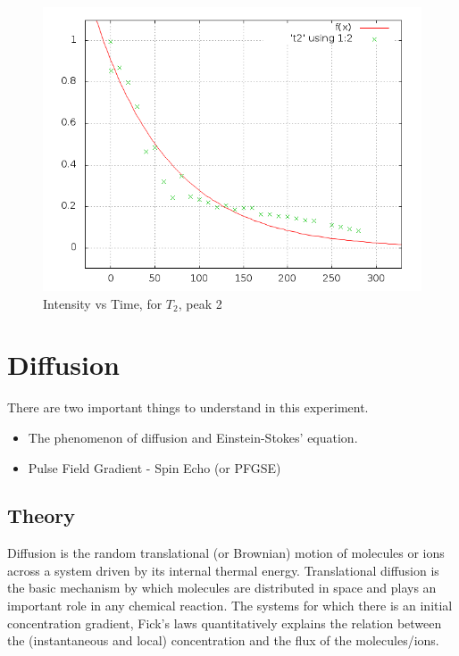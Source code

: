 		\begin{figure}[bth]
			\begin{center}
				\includegraphics[width=1.1\linewidth]{gfx/e3_T2P2}
			\end{center}
		\caption[$T_2$, peak 2]{Intensity vs Time, for $T_2$, peak 2}
		\label{e3T2P2}
		\end{figure}


\section{Diffusion}
	There are two important things to understand in this experiment.
	\begin{itemize}
	\item The phenomenon of diffusion and Einstein-Stokes' equation.
	\item Pulse Field Gradient - Spin Echo (or PFGSE)
	\end{itemize}

	\subsection{Theory}
		Diffusion is the random translational (or Brownian) motion of molecules
		or ions across a system driven by its internal thermal energy. Translational
		diffusion is the basic mechanism by which molecules are distributed
		in space and plays an important role in any chemical reaction. The
		systems for which there is an initial concentration gradient, Fick's
		laws quantitatively explains the relation between the (instantaneous
		and local) concentration and the flux of the molecules/ions.

